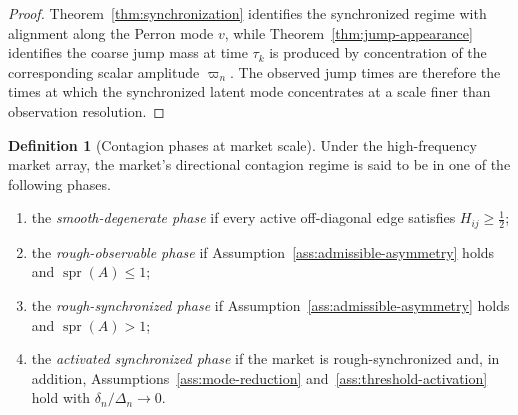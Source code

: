 \documentclass[11pt,a4paper]{amsart}
\theoremstyle{plain}
\theoremstyle{definition}
\newtheorem{definition}[theorem]{Definition}
\theoremstyle{remark}
\DeclareMathOperator{\spr}{spr}
\begin{document}
\begin{proof}
Theorem~\ref{thm:synchronization} identifies the synchronized regime with alignment along the
Perron mode \(v\), while Theorem~\ref{thm:jump-appearance} identifies the coarse jump mass at time
\(\tau_k\) is produced by concentration of the corresponding scalar amplitude \(\varpi_n\).  The
observed jump times are therefore the times at which the synchronized latent mode concentrates at a
scale finer than observation resolution.
\end{proof}

\begin{definition}[Contagion phases at market scale]\label{def:market-phases}
Under the high-frequency market array, the market's directional contagion regime is said to be in
one of the following phases.
\begin{enumerate}[label=(\roman*)]
\item the \emph{smooth-degenerate phase} if every active off-diagonal edge satisfies
\(H_{ij}\ge \tfrac12\);
\item the \emph{rough-observable phase} if Assumption~\ref{ass:admissible-asymmetry} holds and
\(\spr(A)\le 1\);
\item the \emph{rough-synchronized phase} if Assumption~\ref{ass:admissible-asymmetry} holds and
\(\spr(A)>1\);
\item the \emph{activated synchronized phase} if the market is rough-synchronized and, in
addition, Assumptions~\ref{ass:mode-reduction} and~\ref{ass:threshold-activation} hold with
\(\delta_n/\Delta_n\to0\).
\end{enumerate}
\end{definition}
\end{document}
